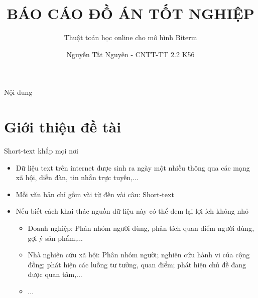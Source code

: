 \documentclass[pdf]{beamer}
\title{BÁO CÁO ĐỒ ÁN TỐT NGHIỆP}
\subtitle{Thuật toán học online cho mô hình Biterm}
\author{Nguyễn Tất Nguyên - CNTT-TT 2.2 K56}
\begin{document}
\begin{frame}
\titlepage
\end{frame}

\begin{frame}{Nội dung}
\tableofcontents
\end{frame}


\section{Giới thiệu đề tài}

\begin{frame}{Short-text khắp mọi nơi}
	\begin{itemize}
		\item Dữ liệu text trên internet được sinh ra ngày một nhiều thông qua các mạng xã hội, diễn đàn, tin nhắn trực tuyến,...
		\item Mỗi văn bản chỉ gồm vài từ đến vài câu: Short-text
		\item Nếu biết cách khai thác nguồn dữ liệu này có thể đem lại lợi ích không nhỏ
			\begin{itemize}
				\item Doanh nghiệp: Phân nhóm người dùng, phân tích quan điểm người dùng, gợi ý sản phẩm,...
				\item Nhà nghiên cứu xã hội: Phân nhóm người; nghiên cứu hành vi của cộng đồng; phát hiện các luồng tư tưởng, quan điểm; phát hiện chủ đề đang được quan tâm,...
				\item ...
			\end{itemize}
	\end{itemize}
\end{frame}
\end{document}
